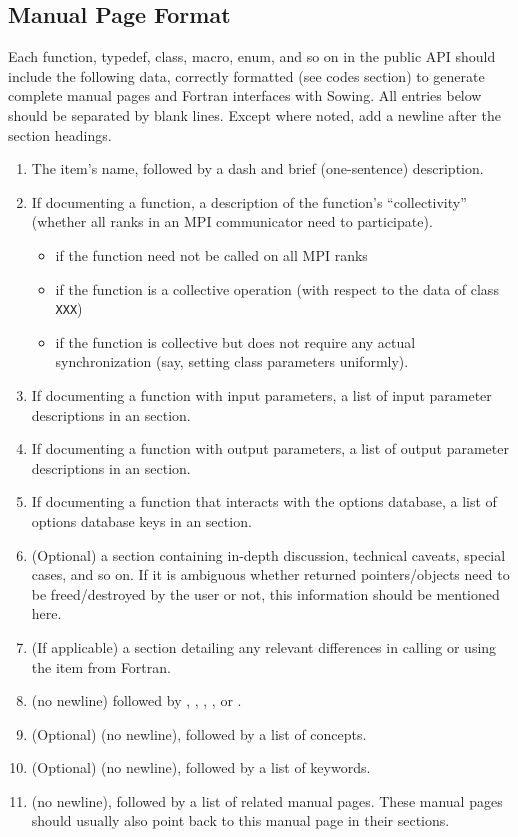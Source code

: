 \subsection*{Manual Page Format}
\label{sec:manpageformat}
Each function, typedef, class, macro, enum, and so on in the public API should include the following data, correctly formatted
(see codes section) to generate complete manual pages and Fortran interfaces with Sowing.
All entries below should be separated by blank lines. Except where noted, add a newline after the section headings.
\begin{enumerate}
  \item The item's name, followed by a dash and brief (one-sentence) description.
  \item If documenting a function, a description of the function's ``collectivity'' (whether all ranks in an MPI communicator need to participate).
    \begin{itemize}
    \item {} if the function need not be called on all MPI ranks
    \item {} if the function is a collective operation (with respect to the data of class \lstinline{XXX})
    \item {} if the function is collective but does not require any actual synchronization (say, setting class parameters uniformly).
    \end{itemize}
  \item If documenting a function with input parameters, a list of input parameter descriptions in an  section.
  \item If documenting a function with output parameters, a list of output parameter descriptions in an  section.
  \item If documenting a function that interacts with the options database, a list of options database keys in an  section.
  \item (Optional) a  section containing in-depth discussion, technical caveats, special cases, and so on.
    If it is ambiguous whether returned pointers/objects need to be freed/destroyed by the user or not, this information should be mentioned here.
  \item (If applicable) a  section detailing any relevant differences in calling or using the item from Fortran.
  \item \label{item:manpagelevel} (no newline) followed by , , , , or .
  \item (Optional)  (no newline), followed by a list of concepts.
  \item (Optional)  (no newline), followed by a list of keywords.
  \item {} (no newline), followed by a list of related manual pages. These manual pages should usually also point back to this manual page in their  sections.
\end{enumerate}

